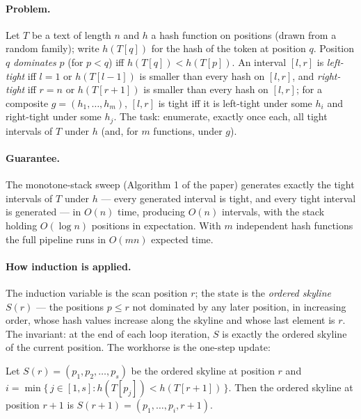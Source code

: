 \paragraph{Problem.}
Let $T$ be a text of length $n$ and $h$ a hash function on positions (drawn from a
random family); write $h(T[q])$ for the hash of the token at position $q$. Position
$q$ \emph{dominates} $p$ (for $p < q$) iff $h(T[q]) < h(T[p])$. An interval $[l,r]$ is
\emph{left-tight} iff $l = 1$ or $h(T[l-1])$ is smaller than every hash on $[l,r]$, and
\emph{right-tight} iff $r = n$ or $h(T[r+1])$ is smaller than every hash on $[l,r]$;
for a composite $g = (h_1,\dots,h_m)$, $[l,r]$ is tight iff it is left-tight under some
$h_i$ and right-tight under some $h_j$. The task: enumerate, exactly once each, all
tight intervals of $T$ under $h$ (and, for $m$ functions, under $g$).

\paragraph{Guarantee.}

\begin{theorem}\label{thm:ind-lsh}
The monotone-stack sweep (Algorithm 1 of the paper) generates exactly the tight
intervals of $T$ under $h$ --- every generated interval is tight, and every tight
interval is generated --- in $O(n)$ time, producing $O(n)$ intervals, with the stack
holding $O(\log n)$ positions in expectation. With $m$ independent hash functions the
full pipeline runs in $O(mn)$ expected time. \eop
\end{theorem}

\paragraph{How induction is applied.}
The induction variable is the scan position $r$; the state is the \emph{ordered
skyline} $S(r)$ --- the positions $p \le r$ not dominated by any later position, in
increasing order, whose hash values increase along the skyline and whose last element
is $r$. The invariant: at the end of each loop iteration, $S$ is exactly the ordered
skyline of the current position. The workhorse is the one-step update:

\begin{lemma}\label{lem:ind-skyline}
Let $S(r) = (p_1, p_2, \dots, p_s)$ be the ordered skyline at position $r$ and
$i = \min\{\, j \in [1,s] : h(T[p_j]) < h(T[r+1]) \,\}$. Then the ordered skyline at
position $r+1$ is $S(r+1) = (p_1, \dots, p_i, r+1)$. \eop
\end{lemma}

